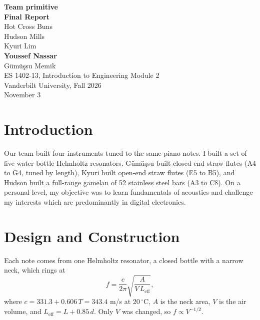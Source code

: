 \documentclass[11pt]{article}
\begin{document}
\thispagestyle{empty}
\begin{center}
    \vspace*{1.5cm}

    {\LARGE\bfseries Team primitive}\\[2.5cm]
    {\fontsize{40}{48}\selectfont\bfseries Final Report}\\[0.8cm]
    {\Large Hot Cross Buns}\\[2.5cm]
    {\large
    Hudson Mills\\
    Kyuri Lim\\
    \textbf{Youssef Nassar}\\
    G\"um\"u\c{s}su Memik}\\[2.5cm]
    {\large ES 1402-13, Introduction to Engineering Module 2\\
    Vanderbilt University, Fall 2026\\
    November 3}
\end{center}
\newpage

\section{Introduction}

Our team built four instruments tuned to the same piano notes. I built a set of five water-bottle Helmholtz resonators. G\"um\"u\c{s}su built closed-end straw flutes (A4 to G4, tuned by length), Kyuri built open-end straw flutes (E5 to B5), and Hudson built a full-range gamelan of 52 stainless steel bars (A3 to C8). On a personal level, my objective was to learn fundamentals of acoustics and challenge my interests which are predominantly in digital electronics.

\section{Design and Construction}

Each note comes from one Helmholtz resonator, a closed bottle with a narrow neck, which rings at
\begin{equation}
f = \frac{c}{2\pi}\sqrt{\frac{A}{V\,L_\mathrm{eff}}} ,
\end{equation}
where $c = 331.3 + 0.606\,T = 343.4$ m/s at 20\,$^\circ$C, $A$ is the neck area, $V$ is the air volume, and $L_\mathrm{eff} = L + 0.85\,d$. Only $V$ was changed, so $f \propto V^{-1/2}$.
\end{document}
